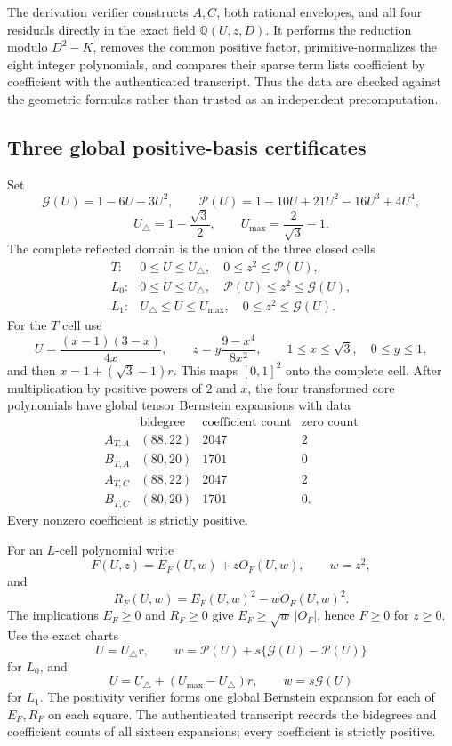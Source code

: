 The derivation verifier constructs $A,C$, both rational envelopes, and all four
residuals directly in the exact field $\mathbb Q(U,z,D)$.  It performs the
reduction modulo $D^2-K$, removes the common positive factor,
primitive-normalizes the eight integer polynomials, and compares their sparse
term lists coefficient by coefficient with the authenticated transcript.  Thus
the data are checked against the geometric formulas rather than trusted as an
independent precomputation.

\subsection{Three global positive-basis certificates}

Set
\[
 \mathcal G(U)=1-6U-3U^2,\qquad
 \mathcal P(U)=1-10U+21U^2-16U^3+4U^4,
\]
\[
 U_\triangle=1-\frac{\sqrt3}{2},\qquad
 U_{\max}=\frac2{\sqrt3}-1.
\]
The complete reflected domain is the union of the three closed cells
\[
\begin{array}{ll}
T:&0\le U\le U_\triangle,\quad 0\le z^2\le\mathcal P(U),\\
L_0:&0\le U\le U_\triangle,\quad \mathcal P(U)\le z^2\le\mathcal G(U),\\
L_1:&U_\triangle\le U\le U_{\max},\quad0\le z^2\le\mathcal G(U).
\end{array}
\]
For the $T$ cell use
\[
 U=\frac{(x-1)(3-x)}{4x},\qquad
 z=y\frac{9-x^4}{8x^2},\qquad
 1\le x\le\sqrt3,\quad0\le y\le1,
\]
and then $x=1+(\sqrt3-1)r$.  This maps $[0,1]^2$ onto the complete cell.
After multiplication by positive powers of $2$ and $x$, the four transformed
core polynomials have global tensor Bernstein expansions with data
\[
\begin{array}{c|ccc}
&\text{bidegree}&\text{coefficient count}&\text{zero count}\\ \hline
A_{T,A}&(88,22)&2047&2\\
B_{T,A}&(80,20)&1701&0\\
A_{T,C}&(88,22)&2047&2\\
B_{T,C}&(80,20)&1701&0.
\end{array}
\]
Every nonzero coefficient is strictly positive.

For an $L$-cell polynomial write
\[
 F(U,z)=E_F(U,w)+zO_F(U,w),\qquad w=z^2,
\]
and
\[
 R_F(U,w)=E_F(U,w)^2-wO_F(U,w)^2.
\]
The implications $E_F\ge0$ and $R_F\ge0$ give
$E_F\ge\sqrt w\,|O_F|$, hence $F\ge0$ for $z\ge0$.
Use the exact charts
\[
 U=U_\triangle r,\qquad
 w=\mathcal P(U)+s\{\mathcal G(U)-\mathcal P(U)\}
\]
for $L_0$, and
\[
 U=U_\triangle+(U_{\max}-U_\triangle)r,\qquad
 w=s\mathcal G(U)
\]
for $L_1$. The positivity verifier forms one global Bernstein expansion for
each of $E_F,R_F$ on each square. The authenticated transcript records the
bidegrees and coefficient counts of all sixteen expansions; every coefficient
is strictly positive.

